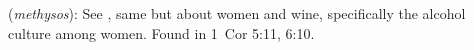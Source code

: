 \item[Drunkenness (woman),]

(\textit{methysos}):
See , same but about women and wine, specifically the alcohol culture among women.
Found in 1~Cor 5:11, 6:10.
